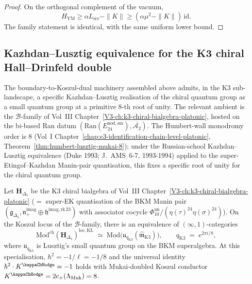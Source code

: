 \begin{proof}
On the orthogonal complement of the vacuum,
\[
H_{\mathrm{YM}}\ge \alpha L_{\mathrm{scr}}-\|K\| \ge (\alpha\mu^2-\|K\|)\,\mathrm{id}.
\]
The family statement is identical, with the same uniform lower bound.
\end{proof}

\subsection{Kazhdan--Lusztig equivalence for the K3 chiral
Hall--Drinfeld double}
\label{subsec:kl-k3-chiral-hd-double}

The boundary-to-Koszul-dual machinery assembled above admits, in the
K3 sub-landscape, a specific Kazhdan--Lusztig realisation of the
chiral quantum group as a small quantum group at a primitive $8$-th
root of unity. The relevant ambient is the $\mathcal{B}$-family of
Vol~III Chapter~\ref{V3-ch:k3-chiral-bialgebra-platonic}, hosted on the
bi-based Ran datum $(\mathrm{Ran}(E^{\mathrm{nod,sm}}_{24}),
\overline{\mathcal{A}_2})$. The Humbert-wall monodromy order is $8$
(Vol~I Chapter~\ref{chap:e3-identification-chain-level-platonic},
Theorem~\ref{thm:humbert-lusztig-mukai-8}); under the Russian-school
Kazhdan--Lusztig equivalence (Duke 1993; J.~AMS~6-7, 1993-1994) applied
to the super-Etingof--Kazhdan Manin-pair quantisation, this fixes a
specific root of unity for the chiral quantum group.

\begin{theorem}
\label{thm:kl-k3-bkm-zeta8}
Let $\mathbf{H}_{\Delta_5}$ be the K3 chiral bialgebra of Vol~III
Chapter~\ref{V3-ch:k3-chiral-bialgebra-platonic}
($=$ super-EK quantisation of the BKM Manin pair
$(\mathfrak{g}_{\Delta_5}, \mathfrak{n}_+^{\mathrm{imag}}\oplus
		\mathfrak{h}^{\mathrm{imag,rk\,23}})$ with associator cocycle
		\(\Phi_{10}^{\mathrm{un}}/(\eta(\tau)^{24}\eta(\sigma)^{24})\)). On the Koszul locus of the
$\mathcal{B}$-family, there is an equivalence of
$(\infty,1)$-categories
\[
 \mathrm{Mod}^{\mathrm{ch}}(\mathbf{H}_{\Delta_5})^{\mathrm{loc,KL}}
 \;\simeq\;
 \mathrm{Mod}\bigl(\mathfrak{u}_{q_{\mathrm{K3}}}
 (\widehat{\mathfrak{m}}_{\mathrm{K3}})\bigr),
 \qquad
 q_{\mathrm{K3}} \;=\; e^{2\pi i/8},
\]
where $\mathfrak{u}_{q_{\mathrm{K3}}}$ is Lusztig's small quantum
group on the BKM superalgebra. At this specialisation, $\hbar^2 =
-1/\ell = -1/8$ and the universal identity $\hbar^2 \cdot
K^{\kappaChHodge} = -1$ holds with Mukai-doubled Koszul
conductor $K^{\kappaChHodge} = 2 c_+(\Lambda_{\mathrm{Muk}}) =
8$.
\end{theorem}

